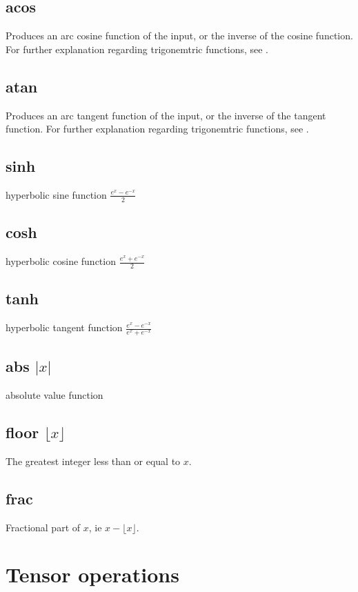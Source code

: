 \subsection{acos}\label{Operation:acos} Produces an arc cosine function of the input, 
or the inverse of the cosine function. For further explanation
regarding trigonemtric functions, see .

\subsection{atan}\label{Operation:atan} Produces an arc tangent function of the input, 
or the inverse of the tangent function. For further explanation
regarding trigonemtric functions, see .

\subsection{sinh}\label{Operation:sinh} hyperbolic sine function
$\frac{e^x-e^{-x}}2$
\subsection{cosh}\label{Operation:cosh} hyperbolic cosine function
$\frac{e^x+e^{-x}}2$
\subsection{tanh}\label{Operation:tanh} hyperbolic tangent function
$\frac{e^x-e^{-x}}{e^x+e^{-x}}$
\subsection{abs $|x|$}\label{Operation:abs} absolute value function
\subsection{floor $\lfloor x\rfloor$}\label{Operation:floor} The
greatest integer less than or equal to $x$.
\subsection{frac}\label{Operation:frac} Fractional part of $x$, ie
$x-\lfloor x\rfloor$.

\section{Tensor operations}\label{tensor
  operations}

